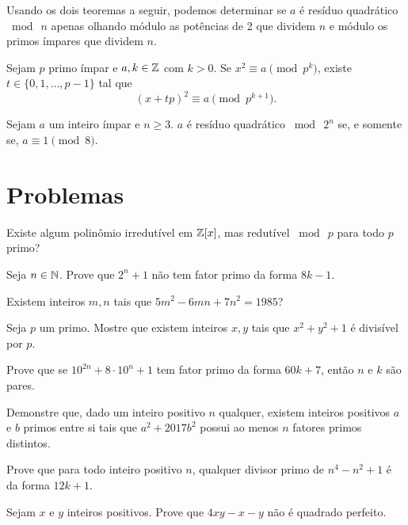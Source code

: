 \documentclass[10pt,a4paper]{article}
\newcommand{\tmod}[1]{\bmod{\ #1}}
\begin{document}
	Usando os dois teoremas a seguir, podemos determinar se $a$ é resíduo quadrático $\tmod{n}$ apenas olhando módulo as potências de 2 que dividem $n$ e módulo os primos ímpares que dividem $n$.

	\begin{thm}
		Sejam $p$ primo ímpar e $a, k \in \mathbb{Z}$ com $k > 0$. Se $x^2 \equiv a \pmod{p^k}$, existe $t \in \{0, 1, \dots, p-1\}$ tal que \[(x+tp)^2 \equiv a \pmod{p^{k+1}}.\]
	\end{thm}
	\begin{thm}
		Sejam $a$ um inteiro ímpar e $n \ge 3$. $a$ é resíduo quadrático $\tmod{2^n}$ se, e somente se, $a \equiv 1 \pmod{8}$.
	\end{thm}


	\newpage
	\section{Problemas}
	\begin{prob}
		Existe algum polinômio irredutível em $\mathbb{Z}[x]$, mas redutível $\tmod{p}$ para todo $p$ primo?
	\end{prob}
	\begin{prob}
		Seja $n \in \mathbb{N}$. Prove que $2^n + 1$ não tem fator primo da forma $8k - 1$.
	\end{prob}
	\begin{prob}
		Existem inteiros $m, n$ tais que $5m^2 - 6mn + 7n^2 = 1985$?
	\end{prob}
	\begin{prob}
		Seja $p$ um primo. Mostre que existem inteiros $x, y$ tais que $x^2 + y^2 + 1$ é divisível por $p$.
	\end{prob}
	\begin{prob}[OBM]
		Prove que se $10^{2n} + 8 \cdot 10^n + 1$ tem fator primo da forma $60k + 7$, então $n$ e $k$ são pares.
	\end{prob}
	\begin{prob}[OBM]
		Demonstre que, dado um inteiro positivo $n$ qualquer, existem inteiros positivos $a$ e $b$ primos entre si tais que $a^2 + 2017b^2$ possui ao menos $n$ fatores primos distintos.
	\end{prob}
	\begin{prob}
		Prove que para todo inteiro positivo $n$, qualquer divisor primo de $n^4 - n^2 + 1$ é da forma $12k + 1$.
	\end{prob}
	\begin{prob}
		Sejam $x$ e $y$ inteiros positivos. Prove que $4xy - x - y$ não é quadrado perfeito.
	\end{prob}
\end{document}
